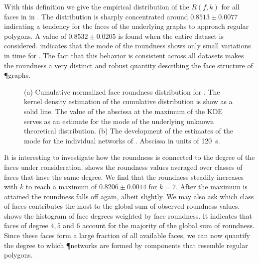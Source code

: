 		With this definition we give the empirical distribution of the $R(f,k)$ for all faces in  in . The distribution is sharply concentrated around $0.8513 \pm 0.0077$ indicating a tendency for the faces of the underlying graphs to approach regular polygons. A value of $0.8532 \pm 0.0205$ is found when the entire dataset is considered.  indicates that the mode of the roundness shows only small variations in time for . The fact that this behavior is consistent across all datasets makes the roundness a very distinct and robust quantity describing the face structure of \P graphs.

		\begin{figure}
			\centering
			\qquad

			\caption[Face roundness distribution]{(a) Cumulative normalized face roundness distribution for . The kernel density estimation of the cumulative distribution is show as a solid line. The value of the abscissa at the maximum of the KDE serves as an estimate for the mode of the underlying unknown theoretical distribution. (b) The development of the estimates of the mode for the individual networks of . Abscissa in units of \SI{120}{\second}.}
		\end{figure}

		It is interesting to investigate how the roundness is connected to the degree of the faces under consideration.  shows the roundness values averaged over classes of faces that have the same degree. We find that the roundness steadily increases with $k$ to reach a maximum of $0.8206 \pm 0.0014$ for $k=7$. After the maximum is attained the roundness falls off again, albeit slightly. We may also ask which class of faces contributes the most to the global sum of observed roundness values.  shows the histogram of face degrees weighted by face roundness. It indicates that faces of degree  $4,5$ and $6$ account for the majority of the global sum of roundness. Since these faces form a large fraction of all available faces, we can now quantify the degree to which \P networks are formed by components that resemble regular polygons.

